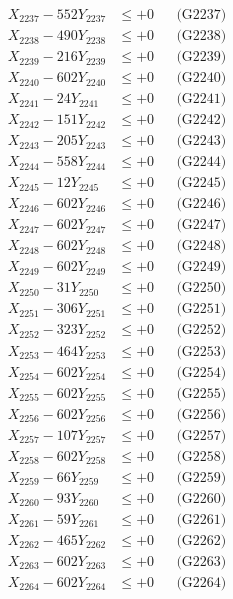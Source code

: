 \documentclass[a4paper,10pt]{article}
\begin{document}
{\begin{align}
X_{2237} - 552Y_{2237} &\leq +0 && \text{(G2237)} \\
X_{2238} - 490Y_{2238} &\leq +0 && \text{(G2238)} \\
X_{2239} - 216Y_{2239} &\leq +0 && \text{(G2239)} \\
X_{2240} - 602Y_{2240} &\leq +0 && \text{(G2240)} \\
\allowbreak
X_{2241} - 24Y_{2241} &\leq +0 && \text{(G2241)} \\
X_{2242} - 151Y_{2242} &\leq +0 && \text{(G2242)} \\
X_{2243} - 205Y_{2243} &\leq +0 && \text{(G2243)} \\
X_{2244} - 558Y_{2244} &\leq +0 && \text{(G2244)} \\
X_{2245} - 12Y_{2245} &\leq +0 && \text{(G2245)} \\
X_{2246} - 602Y_{2246} &\leq +0 && \text{(G2246)} \\
X_{2247} - 602Y_{2247} &\leq +0 && \text{(G2247)} \\
X_{2248} - 602Y_{2248} &\leq +0 && \text{(G2248)} \\
X_{2249} - 602Y_{2249} &\leq +0 && \text{(G2249)} \\
X_{2250} - 31Y_{2250} &\leq +0 && \text{(G2250)} \\
\allowbreak
X_{2251} - 306Y_{2251} &\leq +0 && \text{(G2251)} \\
X_{2252} - 323Y_{2252} &\leq +0 && \text{(G2252)} \\
X_{2253} - 464Y_{2253} &\leq +0 && \text{(G2253)} \\
X_{2254} - 602Y_{2254} &\leq +0 && \text{(G2254)} \\
X_{2255} - 602Y_{2255} &\leq +0 && \text{(G2255)} \\
X_{2256} - 602Y_{2256} &\leq +0 && \text{(G2256)} \\
X_{2257} - 107Y_{2257} &\leq +0 && \text{(G2257)} \\
X_{2258} - 602Y_{2258} &\leq +0 && \text{(G2258)} \\
X_{2259} - 66Y_{2259} &\leq +0 && \text{(G2259)} \\
X_{2260} - 93Y_{2260} &\leq +0 && \text{(G2260)} \\
\allowbreak
X_{2261} - 59Y_{2261} &\leq +0 && \text{(G2261)} \\
X_{2262} - 465Y_{2262} &\leq +0 && \text{(G2262)} \\
X_{2263} - 602Y_{2263} &\leq +0 && \text{(G2263)} \\
X_{2264} - 602Y_{2264} &\leq +0 && \text{(G2264)} \\

\end{align}}
\end{document}
